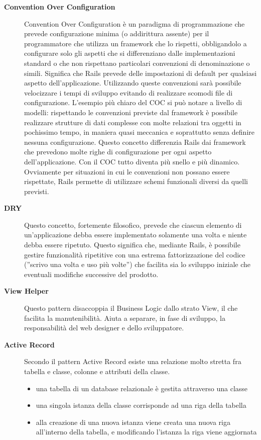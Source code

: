 \documentclass[11pt,a4paper]{article}
\begin{document}
\begin{description}
\item[\textbf{Convention Over Configuration}]
Convention Over Configuration è un paradigma di programmazione che prevede configurazione minima (o addirittura assente) per il programmatore che utilizza un framework che lo rispetti, obbligandolo a configurare solo gli aspetti che si differenziano dalle implementazioni standard o che non rispettano particolari convenzioni di denominazione o simili.
Significa che Rails prevede delle impostazioni di default per qualsiasi aspetto dell’applicazione. Utilizzando queste convenzioni sarà possibile velocizzare i tempi di sviluppo evitando di realizzare scomodi file di configurazione. L’esempio più chiaro del COC si può notare a livello di modelli: rispettando le convenzioni previste dal framework è possibile realizzare strutture di dati complesse con molte relazioni tra oggetti in pochissimo tempo, in maniera quasi meccanica e soprattutto senza definire nessuna configurazione. Questo concetto differenzia Rails dai framework che prevedono molte righe di configurazione per ogni aspetto dell’applicazione. Con il COC tutto diventa più snello e più dinamico. Ovviamente per situazioni in cui le convenzioni non possano essere rispettate, Rails permette di utilizzare schemi funzionali diversi da quelli previsti.
\item[\textbf{DRY}]
Questo concetto, fortemente filosofico, prevede che ciascun elemento di un’applicazione debba essere implementato solamente una volta e niente debba essere ripetuto. Questo significa che, mediante Rails, è possibile gestire funzionalità ripetitive con una estrema fattorizzazione del codice (''scrivo una volta e uso più volte'') che facilita sia lo sviluppo iniziale che eventuali modifiche successive del prodotto.
\item[\textbf{View Helper}]
Questo pattern disaccoppia il Business Logic dallo strato View, il che facilita
la manutenibilità. Aiuta a separare, in fase di sviluppo, la responsabilità
del web designer e dello sviluppatore.
\item[\textbf{Active Record}]
Secondo il pattern Active Record esiste una relazione molto stretta fra tabella e classe, colonne e attributi della classe. 
\begin{itemize}
 \item una tabella di un database relazionale è gestita attraverso una classe
\item una singola istanza della classe corrisponde ad una riga della tabella
\item alla creazione di una nuova istanza viene creata una nuova riga all'interno della tabella, e modificando l'istanza la riga viene aggiornata
\end{itemize}
\end{description}
\end{document}
